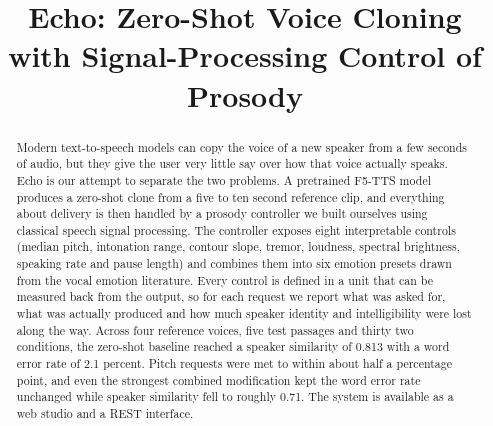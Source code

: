 \documentclass[conference]{IEEEtran}
\begin{document}
\title{Echo: Zero-Shot Voice Cloning with Signal-Processing Control of Prosody}

\author{
\and
{}
\and
{}
\and
{}
}

\maketitle

\begin{abstract}
Modern text-to-speech models can copy the voice of a new speaker from a few seconds of audio, but
they give the user very little say over how that voice actually speaks. Echo is our attempt to
separate the two problems. A pretrained F5-TTS model produces a zero-shot clone from a five to ten
second reference clip, and everything about delivery is then handled by a prosody controller we
built ourselves using classical speech signal processing. The controller exposes eight
interpretable controls (median pitch, intonation range, contour slope, tremor, loudness, spectral
brightness, speaking rate and pause length) and combines them into six emotion presets drawn from
the vocal emotion literature. Every control is defined in a unit that can be measured back from
the output, so for each request we report what was asked for, what was actually produced and how
much speaker identity and intelligibility were lost along the way. Across four reference voices,
five test passages and thirty two conditions, the zero-shot baseline reached a speaker similarity
of 0.813 with a word error rate of 2.1 percent. Pitch requests were met to within about half a
percentage point, and even the strongest combined modification kept the word error rate unchanged
while speaker similarity fell to roughly 0.71. The system is available as a web studio and a REST
interface.
\end{abstract}
\end{document}
